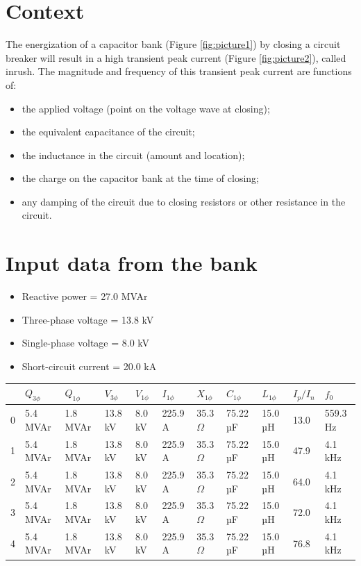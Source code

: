 \documentclass[a4paper]{article}
\begin{document}
	
	\section{Context}
	The energization of a capacitor bank (Figure \ref{fig:picture1}) by closing a circuit breaker will result in a high transient peak current (Figure \ref{fig:picture2}), called inrush. The magnitude and frequency of this transient peak current are functions of:
	\begin{itemize}[label=\textendash]
		\item the applied voltage (point on the voltage wave at closing);
		\item the equivalent capacitance of the circuit;
		\item the inductance in the circuit (amount and location);
		\item the charge on the capacitor bank at the time of closing;
		\item any damping of the circuit due to closing resistors or other resistance in the circuit.
	\end{itemize}
	
	\section{Input data from the bank}
	\begin{itemize}[label=\textendash]
		\item Reactive power  = {{27.0 MVAr}}
		\item Three-phase voltage  = {{13.8 kV}}
		\item Single-phase voltage  = {{8.0 kV}}
		\item Short-circuit current  = {{20.0 kA}}
	\end{itemize}
	
	\begin{center}
		\begin{tabular}{lllllllllll}
\toprule
 & $Q_{3\phi}$ & $Q_{1\phi}$ & $V_{3\phi}$ & $V_{1\phi}$ & $I_{1\phi}$ & $X_{1\phi}$ & $C_{1\phi}$ & $L_{1\phi}$ & $I_{p}/I_{n}$ & $f_{0}$ \\
\midrule
0 & 5.4 MVAr & 1.8 MVAr & 13.8 kV & 8.0 kV & 225.9 A & 35.3 $\Omega$ & 75.22 µF & 15.0 µH & 13.0 & 559.3 Hz \\
1 & 5.4 MVAr & 1.8 MVAr & 13.8 kV & 8.0 kV & 225.9 A & 35.3 $\Omega$ & 75.22 µF & 15.0 µH & 47.9 & 4.1 kHz \\
2 & 5.4 MVAr & 1.8 MVAr & 13.8 kV & 8.0 kV & 225.9 A & 35.3 $\Omega$ & 75.22 µF & 15.0 µH & 64.0 & 4.1 kHz \\
3 & 5.4 MVAr & 1.8 MVAr & 13.8 kV & 8.0 kV & 225.9 A & 35.3 $\Omega$ & 75.22 µF & 15.0 µH & 72.0 & 4.1 kHz \\
4 & 5.4 MVAr & 1.8 MVAr & 13.8 kV & 8.0 kV & 225.9 A & 35.3 $\Omega$ & 75.22 µF & 15.0 µH & 76.8 & 4.1 kHz \\
\bottomrule
\end{tabular}

	\end{center}
	
\end{document}

